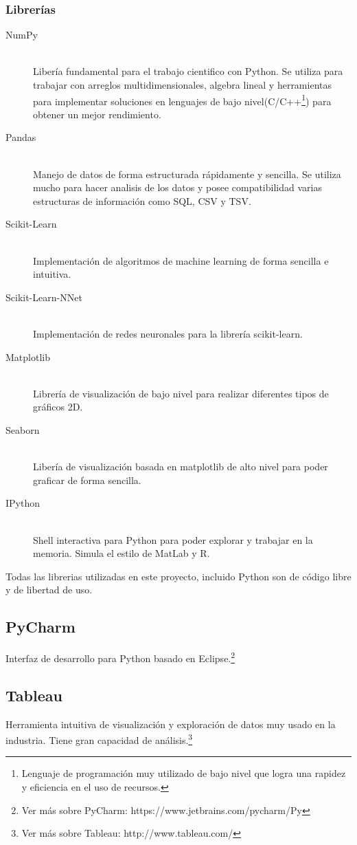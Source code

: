\subsubsection{Librerías}
\begin{description}
  \item[NumPy] \hfill \\
  Libería fundamental para el trabajo cientifico con Python. Se utiliza para trabajar con arreglos multidimensionales, algebra lineal y herramientas para implementar soluciones en lenguajes de bajo nivel(C/C++\footnote{Lenguaje de programación muy utilizado de bajo nivel que logra una rapidez y eficiencia en el uso de recursos.}) para obtener un mejor rendimiento.
  \item[Pandas] \hfill \\
  Manejo de datos de forma estructurada rápidamente y sencilla. Se utiliza mucho para hacer analisis de los datos y posee compatibilidad varias estructuras de información como SQL, CSV y TSV.
  \item[Scikit-Learn] \cite{scikit-learn} \hfill \\
  Implementación de algoritmos de machine learning de forma sencilla e intuitiva.
  \item[Scikit-Learn-NNet] \hfill \\
  Implementación de redes neuronales para la librería scikit-learn.
  \item[Matplotlib] \hfill \\
  Librería de visualización de bajo nivel para realizar diferentes tipos de gráficos 2D.
  \item[Seaborn] \hfill \\
  Libería de visualización basada en matplotlib de alto nivel para poder graficar de forma sencilla.
  \item[IPython] \hfill \\
  Shell interactiva para Python para poder explorar y trabajar en la memoria. Simula el estilo de MatLab y R.
\end{description}
Todas las librerias utilizadas en este proyecto, incluido Python son de código libre y de libertad de uso.
\subsection{PyCharm}
Interfaz de desarrollo para Python basado en Eclipse.\footnote{Ver más sobre PyCharm: https://www.jetbrains.com/pycharm/Py}
\subsection{Tableau}
Herramienta intuitiva de visualización y exploración de datos muy usado en la industria. Tiene gran capacidad de análisis.\footnote{Ver más sobre Tableau: http://www.tableau.com/}
